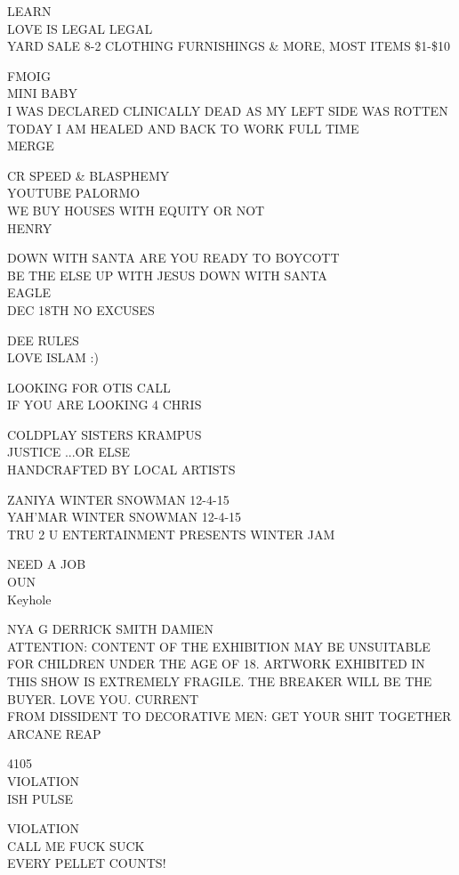 \documentclass[10pt,letterpaper]{article}
\begin{document}
LEARN\\
LOVE IS LEGAL LEGAL\\
YARD SALE 8{-}2 CLOTHING FURNISHINGS \& MORE, MOST ITEMS \$1{-}\$10

FMOIG\\
MINI BABY\\
I WAS DECLARED CLINICALLY DEAD AS MY LEFT SIDE WAS ROTTEN TODAY I AM HEALED AND BACK TO WORK FULL TIME\\
MERGE

CR SPEED \& BLASPHEMY\\
YOUTUBE PALORMO\\
WE BUY HOUSES WITH EQUITY OR NOT\\
HENRY

DOWN WITH SANTA ARE YOU READY TO BOYCOTT\\
BE THE ELSE UP WITH JESUS DOWN WITH SANTA\\
EAGLE\\
DEC 18TH NO EXCUSES

DEE RULES\\
LOVE ISLAM :)

LOOKING FOR OTIS CALL\\
IF YOU ARE LOOKING 4 CHRIS

COLDPLAY SISTERS KRAMPUS\\
JUSTICE ...OR ELSE\\
HANDCRAFTED BY LOCAL ARTISTS

ZANIYA WINTER SNOWMAN 12{-}4{-}15\\
YAH'MAR WINTER SNOWMAN 12{-}4{-}15\\
TRU 2 U ENTERTAINMENT PRESENTS WINTER JAM

NEED A JOB\\
OUN\\
Keyhole

NYA G DERRICK SMITH DAMIEN\\
ATTENTION: CONTENT OF THE EXHIBITION MAY BE UNSUITABLE FOR CHILDREN UNDER THE AGE OF 18.  ARTWORK EXHIBITED IN THIS SHOW IS EXTREMELY FRAGILE.  THE BREAKER WILL BE THE BUYER.  LOVE YOU.  CURRENT\\
FROM DISSIDENT TO DECORATIVE MEN: GET YOUR SHIT TOGETHER\\
ARCANE REAP

4105\\
VIOLATION\\
ISH PULSE

VIOLATION\\
CALL ME FUCK SUCK\\
EVERY PELLET COUNTS!
\end{document}
